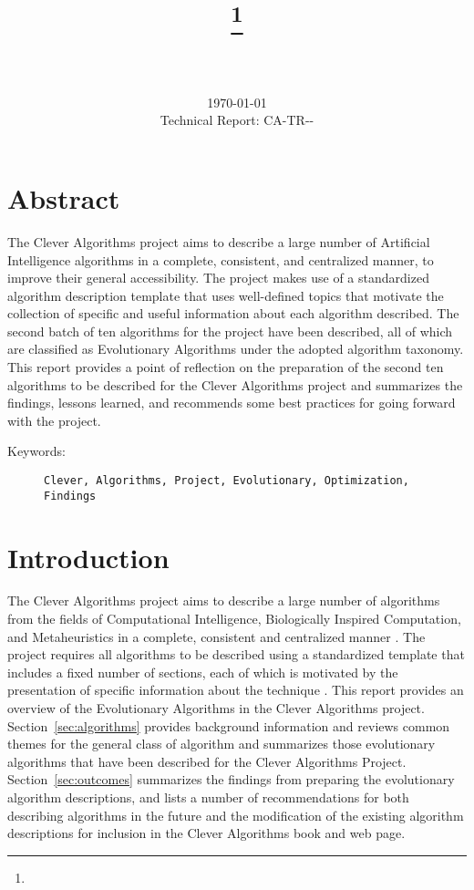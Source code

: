 \documentclass[a4paper, 11pt]{article}
\title{{\myreporttitle}\footnote{\myreportlicense}}
\author{\myreportauthor\\{\myreportemail}\\\small\myreportproject}
\date{\today\\{\small{Technical Report: CA-TR-{\myreportdate}-\myreportversion}}}
\begin{document}
\maketitle

\section*{Abstract} 
The Clever Algorithms project aims to describe a large number of Artificial Intelligence algorithms in a complete, consistent, and centralized manner, to improve their general accessibility. 
The project makes use of a standardized algorithm description template that uses well-defined topics that motivate the collection of specific and useful information about each algorithm described.
The second batch of ten algorithms for the project have been described, all of which are classified as Evolutionary Algorithms under the adopted algorithm taxonomy.
This report provides a point of reflection on the preparation of the second ten algorithms to be described for the Clever Algorithms project and summarizes the findings, lessons learned, and recommends some best practices for going forward with the project.

\begin{description}
	\item[Keywords:] {\small\texttt{Clever, Algorithms, Project, Evolutionary, Optimization, Findings}}
\end{description} 

\section{Introduction}
\label{sec:introduction}
The Clever Algorithms project aims to describe a large number of algorithms from the fields of Computational Intelligence, Biologically Inspired Computation, and Metaheuristics in a complete, consistent and centralized manner \cite{Brownlee2010}.
The project requires all algorithms to be described using a standardized template that includes a fixed number of sections, each of which is motivated by the presentation of specific information about the technique \cite{Brownlee2010a}.
This report provides an overview of the Evolutionary Algorithms in the Clever Algorithms project. 
Section~\ref{sec:algorithms} provides background information and reviews common themes for the general class of algorithm and summarizes those evolutionary algorithms that have been described for the Clever Algorithms Project.
Section~\ref{sec:outcomes} summarizes the findings from preparing the evolutionary algorithm descriptions, and lists a number of recommendations for both describing algorithms in the future and the modification of the existing algorithm descriptions for inclusion in the Clever Algorithms book and web page.
\end{document}
